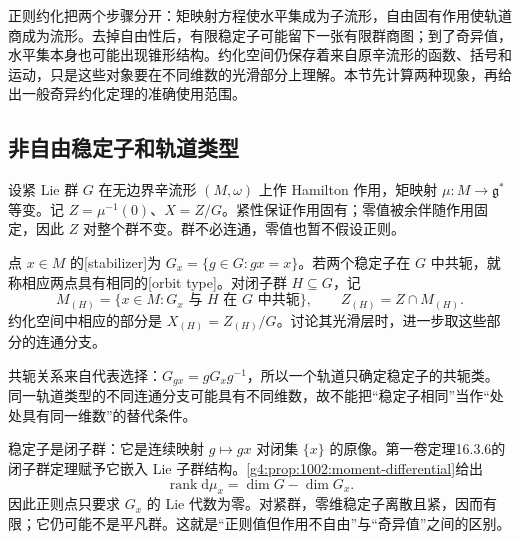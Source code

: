 
% 
% 
% 


正则约化把两个步骤分开：矩映射方程使水平集成为子流形，自由固有作用使轨道商成为流形。去掉自由性后，有限稳定子可能留下一张有限群商图；到了奇异值，水平集本身也可能出现锥形结构。约化空间仍保存着来自原辛流形的函数、括号和运动，只是这些对象要在不同维数的光滑部分上理解。本节先计算两种现象，再给出一般奇异约化定理的准确使用范围。

\subsection{非自由稳定子和轨道类型}
\label{g4:subsec:1004:01}
设紧 Lie 群 \(G\) 在无边界辛流形 \((M,\omega)\) 上作 Hamilton 作用，矩映射 \(\mu:M\to\mathfrak g^*\) 等变。记 \(Z=\mu^{-1}(0)\)、\(X=Z/G\)。紧性保证作用固有；零值被余伴随作用固定，因此 \(Z\) 对整个群不变。群不必连通，零值也暂不假设正则。

\begin{definition}\label{g4:def:1004:orbit-type}
	点 \(x\in M\) 的[stabilizer]为 \(G_x=\{g\in G:gx=x\}\)。若两个稳定子在 \(G\) 中共轭，就称相应两点具有相同的[orbit type]。对闭子群 \(H\subseteq G\)，记
	\[
		M_{(H)}=\{x\in M:G_x\text{ 与 }H\text{ 在 }G\text{ 中共轭}\},
		\qquad Z_{(H)}=Z\cap M_{(H)}.
	\]
	约化空间中相应的部分是 \(X_{(H)}=Z_{(H)}/G\)。讨论其光滑层时，进一步取这些部分的连通分支。
\end{definition}

共轭关系来自代表选择：\(G_{gx}=gG_xg^{-1}\)，所以一个轨道只确定稳定子的共轭类。同一轨道类型的不同连通分支可能具有不同维数，故不能把“稳定子相同”当作“处处具有同一维数”的替代条件。

\ProseParagraphBreak

稳定子是闭子群：它是连续映射 \(g\mapsto gx\) 对闭集 \(\{x\}\) 的原像。第一卷定理16.3.6的闭子群定理赋予它嵌入 Lie 子群结构。\cref{g4:prop:1002:moment-differential}给出
\[
	\operatorname{rank}\mathrm{d}\mu_x=\dim G-\dim G_x.
\]
因此正则点只要求 \(G_x\) 的 Lie 代数为零。对紧群，零维稳定子离散且紧，因而有限；它仍可能不是平凡群。这就是“正则值但作用不自由”与“奇异值”之间的区别。

